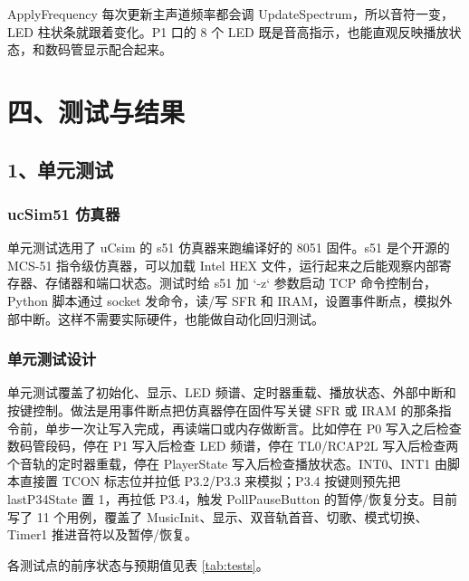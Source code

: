 \documentclass[zihao=-4,a4paper]{ctexart}
\begin{document}
ApplyFrequency 每次更新主声道频率都会调 UpdateSpectrum，所以音符一变，LED 柱状条就跟着变化。P1 口的 8 个 LED 既是音高指示，也能直观反映播放状态，和数码管显示配合起来。

\section*{四、测试与结果}

\subsection*{1、单元测试}

\subsubsection*{ucSim51 仿真器}

单元测试选用了 uCsim 的 s51 仿真器来跑编译好的 8051 固件。s51 是个开源的 MCS-51 指令级仿真器，可以加载 Intel HEX 文件，运行起来之后能观察内部寄存器、存储器和端口状态。测试时给 s51 加 `-z` 参数启动 TCP 命令控制台，Python 脚本通过 socket 发命令，读/写 SFR 和 IRAM，设置事件断点，模拟外部中断。这样不需要实际硬件，也能做自动化回归测试。

\subsubsection*{单元测试设计}

单元测试覆盖了初始化、显示、LED 频谱、定时器重载、播放状态、外部中断和按键控制。做法是用事件断点把仿真器停在固件写关键 SFR 或 IRAM 的那条指令前，单步一次让写入完成，再读端口或内存做断言。比如停在 P0 写入之后检查数码管段码，停在 P1 写入后检查 LED 频谱，停在 TL0/RCAP2L 写入后检查两个音轨的定时器重载，停在 PlayerState 写入后检查播放状态。INT0、INT1 由脚本直接置 TCON 标志位并拉低 P3.2/P3.3 来模拟；P3.4 按键则预先把 lastP34State 置 1，再拉低 P3.4，触发 PollPauseButton 的暂停/恢复分支。目前写了 11 个用例，覆盖了 MusicInit、显示、双音轨首音、切歌、模式切换、Timer1 推进音符以及暂停/恢复。

各测试点的前序状态与预期值见表 \ref{tab:tests}。
\end{document}
